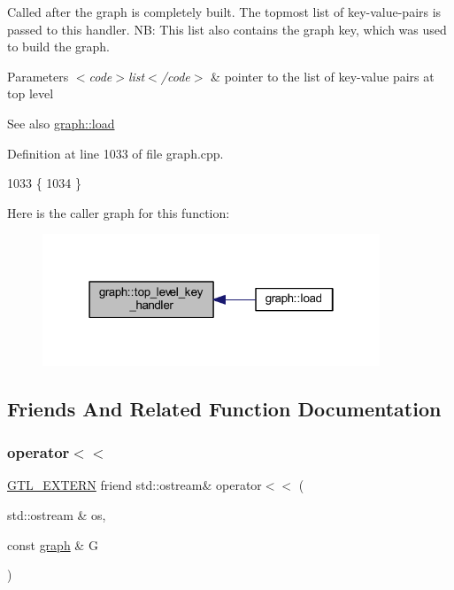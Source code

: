 Called after the graph is completely built. The topmost list of key-\/value-\/pairs is passed to this handler. NB\+: This list also contains the graph key, which was used to build the graph.


\begin{DoxyParams}{Parameters}
{\em $<$code$>$list$<$/code$>$} & pointer to the list of key-\/value pairs at top level \\
\hline
\end{DoxyParams}
\begin{DoxySeeAlso}{See also}
\mbox{\hyperlink{classgraph_ac28cb3468623a480709d3329033d4ec8}{graph\+::load}} 
\end{DoxySeeAlso}


Definition at line 1033 of file graph.\+cpp.


\begin{DoxyCode}
1033                                               \{
1034 \}
\end{DoxyCode}
Here is the caller graph for this function\+:
\nopagebreak
\begin{figure}[H]
\begin{center}
\leavevmode
\includegraphics[width=286pt]{classgraph_a33bc9b45f0d4738c491535147b703cc5_icgraph}
\end{center}
\end{figure}


\subsection{Friends And Related Function Documentation}
\mbox{\label{classgraph_a8f5a0a75aaee54ab9b35dc9b777684aa}} 
\subsubsection{\texorpdfstring{operator$<$$<$}{operator<<}}
{\footnotesize\ttfamily \mbox{\hyperlink{_g_t_l_8h_a014cd1e9b3e67a78ae433eda95c8fd25}{G\+T\+L\+\_\+\+E\+X\+T\+E\+RN}} friend std\+::ostream\& operator$<$$<$ (\begin{DoxyParamCaption}\item[{std\+::ostream \&}]{os,  }\item[{const \mbox{\hyperlink{classgraph}{graph}} \&}]{G }\end{DoxyParamCaption})\hspace{0.3cm}{\ttfamily [friend]}}



